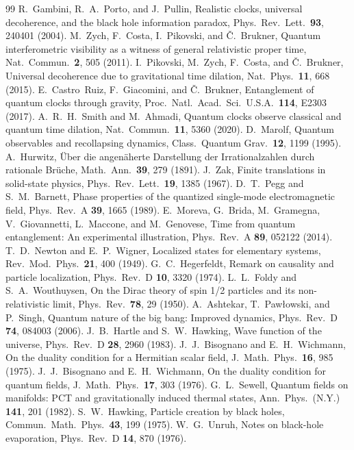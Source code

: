 \documentclass[aps,prd,onecolumn,notitlepage,10pt,amsmath,amssymb,amsfonts,nofootinbib]{revtex4-2}
\theoremstyle{definition}
\theoremstyle{remark}
\begin{document}
\begin{thebibliography}{99}
 R.~Gambini, R.~A.~Porto, and J.~Pullin, Realistic clocks, universal decoherence, and the black hole information paradox, Phys.\ Rev.\ Lett.\ \textbf{93}, 240401 (2004).
 M.~Zych, F.~Costa, I.~Pikovski, and \v{C}.~Brukner, Quantum interferometric visibility as a witness of general relativistic proper time, Nat.\ Commun.\ \textbf{2}, 505 (2011).
 I.~Pikovski, M.~Zych, F.~Costa, and \v{C}.~Brukner, Universal decoherence due to gravitational time dilation, Nat.\ Phys.\ \textbf{11}, 668 (2015).
 E.~Castro~Ruiz, F.~Giacomini, and \v{C}.~Brukner, Entanglement of quantum clocks through gravity, Proc.\ Natl.\ Acad.\ Sci.\ U.S.A.\ \textbf{114}, E2303 (2017).
 A.~R.~H.~Smith and M.~Ahmadi, Quantum clocks observe classical and quantum time dilation, Nat.\ Commun.\ \textbf{11}, 5360 (2020).
 D.~Marolf, Quantum observables and recollapsing dynamics, Class.\ Quantum Grav.\ \textbf{12}, 1199 (1995).
 A.~Hurwitz, \"Uber die angen\"aherte Darstellung der Irrationalzahlen durch rationale Br\"uche, Math.\ Ann.\ \textbf{39}, 279 (1891).
 J.~Zak, Finite translations in solid-state physics, Phys.\ Rev.\ Lett.\ \textbf{19}, 1385 (1967).
 D.~T.~Pegg and S.~M.~Barnett, Phase properties of the quantized single-mode electromagnetic field, Phys.\ Rev.\ A \textbf{39}, 1665 (1989).
 E.~Moreva, G.~Brida, M.~Gramegna, V.~Giovannetti, L.~Maccone, and M.~Genovese, Time from quantum entanglement: An experimental illustration, Phys.\ Rev.\ A \textbf{89}, 052122 (2014).
 T.~D.~Newton and E.~P.~Wigner, Localized states for elementary systems, Rev.\ Mod.\ Phys.\ \textbf{21}, 400 (1949).
 G.~C.~Hegerfeldt, Remark on causality and particle localization, Phys.\ Rev.\ D \textbf{10}, 3320 (1974).
 L.~L.~Foldy and S.~A.~Wouthuysen, On the Dirac theory of spin 1/2 particles and its non-relativistic limit, Phys.\ Rev.\ \textbf{78}, 29 (1950).
 A.~Ashtekar, T.~Paw{\l}owski, and P.~Singh, Quantum nature of the big bang: Improved dynamics, Phys.\ Rev.\ D \textbf{74}, 084003 (2006).
 J.~B.~Hartle and S.~W.~Hawking, Wave function of the universe, Phys.\ Rev.\ D \textbf{28}, 2960 (1983).
 J.~J.~Bisognano and E.~H.~Wichmann, On the duality condition for a Hermitian scalar field, J.\ Math.\ Phys.\ \textbf{16}, 985 (1975).
 J.~J.~Bisognano and E.~H.~Wichmann, On the duality condition for quantum fields, J.\ Math.\ Phys.\ \textbf{17}, 303 (1976).
 G.~L.~Sewell, Quantum fields on manifolds: PCT and gravitationally induced thermal states, Ann.\ Phys.\ (N.Y.) \textbf{141}, 201 (1982).
 S.~W.~Hawking, Particle creation by black holes, Commun.\ Math.\ Phys.\ \textbf{43}, 199 (1975).
 W.~G.~Unruh, Notes on black-hole evaporation, Phys.\ Rev.\ D \textbf{14}, 870 (1976).
\end{thebibliography}
\end{document}
